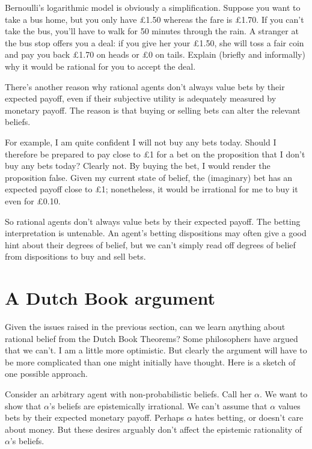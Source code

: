 \begin{exercise}{1}
  Bernoulli's logarithmic model is obviously a simplification. Suppose
  you want to take a bus home, but you only have £1.50 whereas the
  fare is £1.70. If you can't take the bus, you'll have to walk for 50
  minutes through the rain. A stranger at the bus stop offers you a
  deal: if you give her your £1.50, she will toss a fair coin and pay
  you back £1.70 on heads or £0 on tails. Explain (briefly and
  informally) why it would be rational for you to accept the deal.
\end{exercise}

There's another reason why rational agents don't always value bets by
their expected payoff, even if their subjective utility is adequately
measured by monetary payoff. The reason is that buying or selling bets
can alter the relevant beliefs. 

For example, I am quite confident I will not buy any bets
today. Should I therefore be prepared to pay close to £1 for a bet on
the proposition that I don't buy any bets today? Clearly not. By
buying the bet, I would render the proposition false. Given my current
state of belief, the (imaginary) bet has an expected payoff close to
£1; nonetheless, it would be irrational for me to buy it even for £0.10.

So rational agents don't always value bets by their expected
payoff. The betting interpretation is untenable. An agent's betting
dispositions may often give a good hint about their degrees of belief,
but we can't simply read off degrees of belief from dispositions to
buy and sell bets.

\section{A Dutch Book argument}


Given the issues raised in the previous section, can we learn anything
about rational belief from the Dutch Book Theorems? Some philosophers
have argued that we can't. I am a little more optimistic. But clearly
the argument will have to be more complicated than one might initially
have thought. Here is a sketch of one possible approach.

Consider an arbitrary agent with non-probabilistic beliefs. Call her
$\alpha$. We want to show that $\alpha$'s beliefs are epistemically
irrational. We can't assume that $\alpha$ values bets by their
expected monetary payoff. Perhaps $\alpha$ hates betting, or doesn't
care about money. But these desires arguably don't affect the
epistemic rationality of $\alpha$'s beliefs. 

